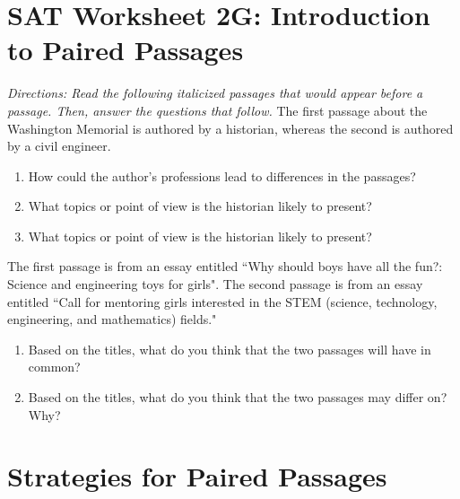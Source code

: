 \vfill
\section[Intro to Paired Passages]{SAT Worksheet 2G: Introduction to Paired Passages}
\textit{Directions: Read the following italicized passages that would appear before a passage. Then, answer the questions that follow.}
The first passage about the Washington Memorial is authored by a historian, whereas the second is authored by a civil engineer.
\begin{enumerate}
\item How could the author's professions lead to differences in the passages?

\hrulefill
\item What topics or point of view is the historian likely to present?

\hrulefill
\item What topics or point of view is the historian likely to present?

\hrulefill
\end{enumerate}


The first passage is from an essay entitled ``Why should boys have all the fun?: Science and engineering toys for girls". The second passage is from an essay entitled ``Call for mentoring girls interested in the STEM (science, technology, engineering, and mathematics) fields."

\begin{enumerate}
\item Based on the titles, what do you think that the two passages will have in common?

\hrulefill
\item Based on the titles, what do you think that the two passages may differ on? Why?

\hrulefill
\end{enumerate}

\vfill
\newpage
\section[Strategies]{Strategies for Paired Passages}

